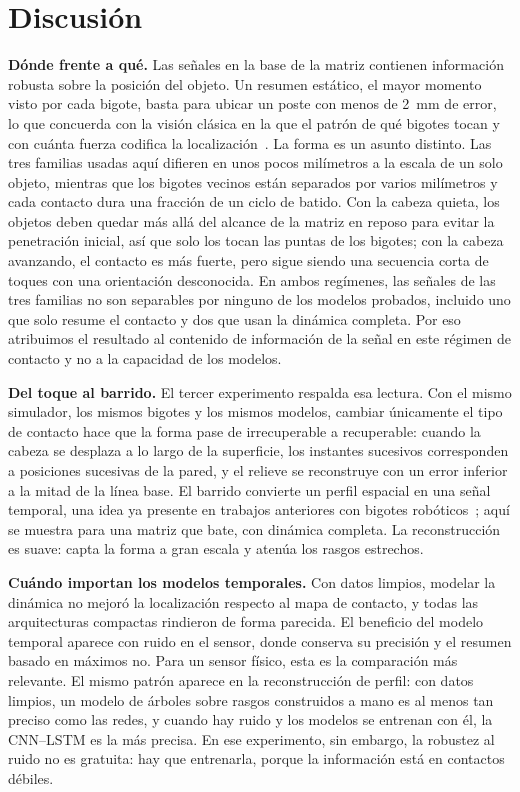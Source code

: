 \documentclass[conference]{IEEEtran}
\begin{document}
\section{Discusión}
\textbf{Dónde frente a qué.} Las señales en la base de la matriz contienen información robusta sobre la posición del objeto. Un resumen estático, el mayor momento visto por cada bigote, basta para ubicar un poste con menos de 2~mm de error, lo que concuerda con la visión clásica en la que el patrón de qué bigotes tocan y con cuánta fuerza codifica la localización~\cite{kaneko1998,birdwell2007}. La forma es un asunto distinto. Las tres familias usadas aquí difieren en unos pocos milímetros a la escala de un solo objeto, mientras que los bigotes vecinos están separados por varios milímetros y cada contacto dura una fracción de un ciclo de batido. Con la cabeza quieta, los objetos deben quedar más allá del alcance de la matriz en reposo para evitar la penetración inicial, así que solo los tocan las puntas de los bigotes; con la cabeza avanzando, el contacto es más fuerte, pero sigue siendo una secuencia corta de toques con una orientación desconocida. En ambos regímenes, las señales de las tres familias no son separables por ninguno de los modelos probados, incluido uno que solo resume el contacto y dos que usan la dinámica completa. Por eso atribuimos el resultado al contenido de información de la señal en este régimen de contacto y no a la capacidad de los modelos.

\textbf{Del toque al barrido.} El tercer experimento respalda esa lectura. Con el mismo simulador, los mismos bigotes y los mismos modelos, cambiar únicamente el tipo de contacto hace que la forma pase de irrecuperable a recuperable: cuando la cabeza se desplaza a lo largo de la superficie, los instantes sucesivos corresponden a posiciones sucesivas de la pared, y el relieve se reconstruye con un error inferior a la mitad de la línea base. El barrido convierte un perfil espacial en una señal temporal, una idea ya presente en trabajos anteriores con bigotes robóticos~\cite{solomon2006}; aquí se muestra para una matriz que bate, con dinámica completa. La reconstrucción es suave: capta la forma a gran escala y atenúa los rasgos estrechos.

\textbf{Cuándo importan los modelos temporales.} Con datos limpios, modelar la dinámica no mejoró la localización respecto al mapa de contacto, y todas las arquitecturas compactas rindieron de forma parecida. El beneficio del modelo temporal aparece con ruido en el sensor, donde conserva su precisión y el resumen basado en máximos no. Para un sensor físico, esta es la comparación más relevante. El mismo patrón aparece en la reconstrucción de perfil: con datos limpios, un modelo de árboles sobre rasgos construidos a mano es al menos tan preciso como las redes, y cuando hay ruido y los modelos se entrenan con él, la CNN--LSTM es la más precisa. En ese experimento, sin embargo, la robustez al ruido no es gratuita: hay que entrenarla, porque la información está en contactos débiles.
\end{document}
